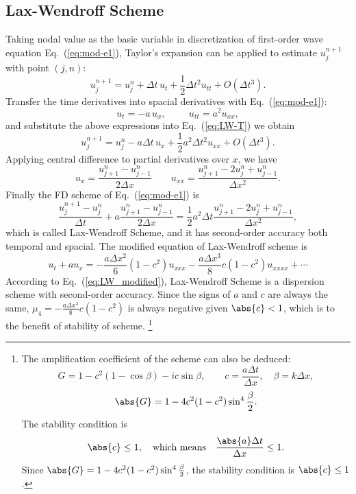 \documentclass[]{article}
\begin{document}
\subsection{Lax-Wendroff Scheme} \label{sec:lax-wendroff-scheme}

Taking nodal value as the basic variable in discretization of first-order 
wave equation Eq.~(\ref{eq:mod-e1}), Taylor's expansion can be
applied to estimate $u_j^{n+1}$ with point $(j,n)$:
\begin{equation}
    u_j^{n+1}=u_j^n+\Delta t\,u_t +\frac{1}{2}\Delta t^2 u_{tt}+O(\Delta t^3).
    \label{eq:LW-T} 
\end{equation}
Transfer the time derivatives into spacial derivatives with
Eq.~(\ref{eq:mod-e1}):
\begin{equation*}
    u_t=-a\, u_x,\hspace{1cm} u_{tt} = a^2 u_{xx},
\end{equation*}
and substitute the above expressions into Eq.~(\ref{eq:LW-T}) we
obtain
\begin{equation}
    u_j^{n+1}=u_j^n-a\Delta t\, u_x +\frac{1}{2}a^2\Delta t^2 u_{xx}+O(\Delta t^3).
    \label{eq:LW-T1} 
\end{equation}
Applying central difference to partial derivatives over $x$, we have
\begin{equation*}
    u_x=\dfrac{u_{j+1}^n-u_{j-1}^n}{2\Delta x} \qquad
    u_{xx}=\dfrac{u_{j+1}^n-2u_j^n+u_{j-1}^n}{\Delta x^2}.
\end{equation*}
Finally the FD scheme of Eq.~(\ref{eq:mod-e1}) is
\begin{equation*}
    \label{eq:LW} \dfrac{u_{j}^{n+1}-u_{j}^n}{\Delta
    t}+a\dfrac{u_{j+1}^n-u_{j-1}^n}{2\Delta x} =\dfrac{1}{2}a^2\Delta
    t\dfrac{u_{j+1}^n-2u_j^n+u_{j-1}^n}{\Delta x^2},
\end{equation*}
which is called Lax-Wendroff Scheme, and it has second-order accuracy
both temporal and spacial. The modified equation of Lax-Wendroff
scheme is
\begin{equation}
    u_t+au_x=-\frac{a\Delta x^2}{6}(1-c^2)u_{xxx} -\frac{a\Delta x^3}{8}c(1-c^2)u_{xxxx}+\cdots
    \label{eq:LW_modified}
\end{equation}
According to Eq.~(\ref{eq:LW_modified}), Lax-Wendroff Scheme is a
dispersion scheme with second-order accuracy. Since the signs of $a$
and $c$ are always the same, $\mu_4=-\frac{a\Delta x^3}{8}c(1-c^2)$ is
always negative given $\abs{c} < 1$, which is to the benefit of
stability of scheme.
\footnote{The amplification coefficient of the scheme can also be deduced:
\begin{equation*}
    G=1-c^2(1-\cos\beta)-ic\sin\beta,\quad\quad
    c=\frac{a\Delta t}{\Delta x},\quad \beta=k\Delta x,
\end{equation*}
\begin{equation*}
    \abs{G}=1-4c^2(1-c^2)\sin^4\frac{\beta}{2}.
\end{equation*}
The stability condition is
\begin{equation*}
    \abs{c}\leq 1,\quad\mbox{which means}\quad
    \frac{\abs{a}\Delta t}{\Delta x}\leq 1.
\end{equation*}
Since $\abs{G}=1-4c^2(1-c^2)\sin^4\frac{\beta}{2}$, the stability condition is
$\abs{c}\leq1$.}
\end{document}
